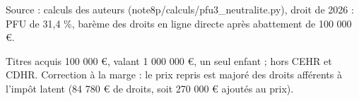Source : calculs des auteurs (note8p/calculs/pfu3\_neutralite.py), droit de 2026 : PFU de 31,4 \%, barème des droits en ligne directe après abattement de 100 000 €.\par Titres acquis 100 000 €, valant 1 000 000 €, un seul enfant ; hors CEHR et CDHR. Correction à la marge : le prix repris est majoré des droits afférents à l'impôt latent (84 780 € de droits, soit 270 000 € ajoutés au prix).
